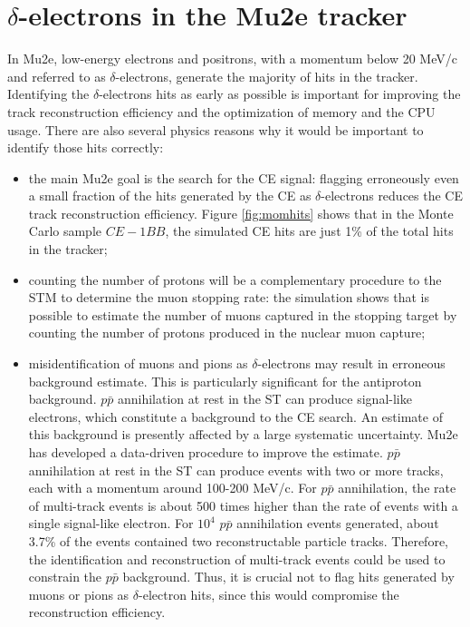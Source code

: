 \section{$\delta$-electrons in the Mu2e tracker}\label{trackerdeltas}

In Mu2e, low-energy electrons 
and positrons, with a momentum below 20 MeV/c and 
referred to as $\delta$-electrons, 
generate the majority of hits in the tracker. 
Identifying the $\delta$-electrons hits as early 
as possible is important for improving the track reconstruction efficiency and 
the optimization of memory and the CPU usage. There are also several physics 
reasons why it would be important to identify 
those hits correctly:
\begin{itemize}
    \item the main Mu2e goal is the search for the 
    CE signal: flagging erroneously even a small 
    fraction of the hits generated by the 
    CE as $\delta$-electrons reduces the CE track reconstruction efficiency. 
    Figure \ref{fig:momhits} shows that in the 
    Monte Carlo sample $CE-1BB$, the simulated CE 
    hits are just 1\% of the total hits in the tracker;
    \item counting the number of protons 
    will be a complementary procedure to the 
    STM to determine the muon stopping rate: 
    the simulation shows that is possible to 
    estimate the number of muons captured in 
    the stopping target by counting the number 
    of protons produced in the nuclear muon 
    capture;
    \item misidentification of muons 
      and pions as $\delta$-electrons 
    may result in erroneous background estimate. 
    This is particularly significant for the 
    antiproton background.
    $p\bar{p}$ annihilation at rest in the ST 
    can produce signal-like electrons, which 
    constitute a background to the CE search. An estimate of this background is 
    presently affected by a large systematic 
    uncertainty. Mu2e has developed a data-driven 
    procedure to improve the estimate.
    $p\bar{p}$ annihilation at rest in the ST 
    can produce events with two or more tracks, 
    each with a momentum around 100-200 MeV/c. 
    For $p\bar{p}$ annihilation, 
    the rate of multi-track events 
    is about 500 times higher 
    than the rate of events with a single 
    signal-like electron. 
    For $10^4$ $p\bar{p}$ annihilation events 
    generated, about 3.7\% of 
    the events contained two reconstructable 
    particle tracks. Therefore, 
    the identification and reconstruction of 
    multi-track events could be 
    used to constrain the $p\bar{p}$ background. 
    Thus, it is crucial not to flag hits 
    generated by muons or pions as $\delta$-electron 
    hits, since this would compromise the 
    reconstruction efficiency. 
\end{itemize}
